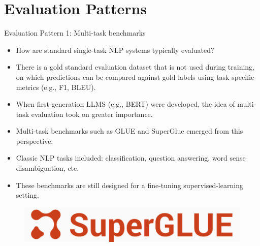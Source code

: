 \documentclass[handout]{beamer}
\begin{document}


\section{Evaluation Patterns}
\begin{frame}{Evaluation Pattern 1: Multi-task benchmarks }
\begin{scriptsize}
\begin{itemize}
\item How are standard single-task NLP systems typically evaluated?
\item There is a gold standard evaluation dataset that is not used during training, on which predictions can be compared against gold labels using task specific metrics (e.g., F1, BLEU).
\item When first-generation LLMS (e.g., BERT) were developed, the idea of multi-task evaluation took on greater importance.
\item Multi-task benchmarks such as GLUE and SuperGlue emerged from this perspective.
\item Classic NLP tasks included: classification, question answering, word sense disambiguation, etc. 
\item These benchmarks are still designed for a fine-tuning supervised-learning setting.
\end{itemize}
\end{scriptsize}
      \begin{figure}[h]
	\includegraphics[scale = 0.3]{pics/superglue.png}
\end{figure}

\end{frame}
\end{document}
